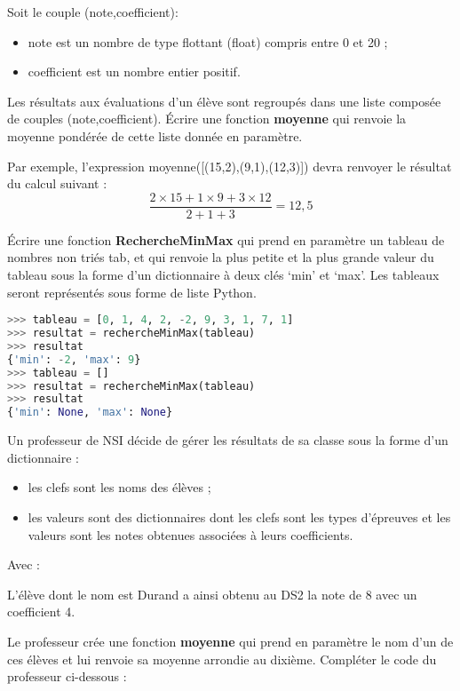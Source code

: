 \documentclass[a4paper,11pt]{article}
\begin{document}
\begin{exo}
    Soit le couple (note,coefficient):
    \begin{itemize}
        \item note est un nombre de type flottant (float) compris entre 0 et 20 ;
        \item coefficient est un nombre entier positif.
    \end{itemize}
    Les résultats aux évaluations d'un élève sont regroupés dans une liste composée de couples (note,coefficient).
    Écrire une fonction \textbf{moyenne} qui renvoie la moyenne pondérée de cette liste donnée en
    paramètre.

    Par exemple, l’expression moyenne([(15,2),(9,1),(12,3)]) devra renvoyer le
    résultat du calcul suivant :
    $$\dfrac{2 × 15 + 1 × 9 + 3 × 12}{2+1+3} = 12,5$$
\end{exo}
\begin{exo}
    Écrire une fonction \textbf{RechercheMinMax} qui prend en paramètre un tableau de nombres
    non triés tab, et qui renvoie la plus petite et la plus grande valeur du tableau sous la
    forme d’un dictionnaire à deux clés ‘min’ et ‘max’. Les tableaux seront représentés sous
    forme de liste Python.

    \begin{center}
        \begin{lstlisting}[language=Python]
>>> tableau = [0, 1, 4, 2, -2, 9, 3, 1, 7, 1]
>>> resultat = rechercheMinMax(tableau)
>>> resultat
{'min': -2, 'max': 9}
>>> tableau = []
>>> resultat = rechercheMinMax(tableau)
>>> resultat
{'min': None, 'max': None}
    \end{lstlisting}
        \label{CODE}
    \end{center}

\end{exo}
\begin{exo}
    Un professeur de NSI décide de gérer les résultats de sa classe sous la forme d’un
    dictionnaire :
    \begin{itemize}
        \item les clefs sont les noms des élèves ;
        \item les valeurs sont des dictionnaires dont les clefs sont les types d’épreuves et les
        valeurs sont les notes obtenues associées à leurs coefficients.
    \end{itemize}
    Avec :


L’élève dont le nom est Durand a ainsi obtenu au DS2 la note de 8 avec un coefficient 4.

Le professeur crée une fonction \textbf{moyenne} qui prend en paramètre le nom d’un de ces élèves et lui renvoie sa moyenne arrondie au dixième.
Compléter le code du professeur ci-dessous :

\end{exo}
\end{document}

